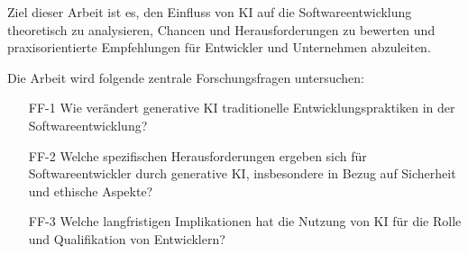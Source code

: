 Ziel dieser Arbeit ist es, den Einfluss von KI auf die Softwareentwicklung theoretisch zu analysieren, Chancen und Herausforderungen zu bewerten und praxisorientierte Empfehlungen für Entwickler und Unternehmen abzuleiten.

Die Arbeit wird folgende zentrale Forschungsfragen untersuchen:

\begin{itemize}
    \item[FF-1] Wie verändert generative KI traditionelle Entwicklungspraktiken in der Softwareentwicklung?
    \item[FF-2] Welche spezifischen Herausforderungen ergeben sich für Softwareentwickler durch generative KI, insbesondere in Bezug auf Sicherheit und ethische Aspekte?
    \item[FF-3] Welche langfristigen Implikationen hat die Nutzung von KI für die Rolle und Qualifikation von Entwicklern?
\end{itemize}